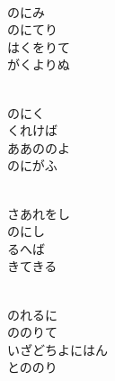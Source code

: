 \documentclass[10pt,b5j]{tarticle} %
\begin{document}
\begin{enumerate}
\begin{minipage}[c]{\blocksize}
        \vspace{\linespace}
        \item~\\
        のにみ\\
        のにてり\\
        はくをりて\\
        がくよりぬ
        
        \vspace{\linespace}
        \item~\\
        のにく\\
        くれけば\\
        ああののよ\\
        のにがふ
        
        \vspace{\linespace}
        \item~\\
        さあれをし\\
        のにし\\
        るへば\\
        きてきる
        
        \vspace{\linespace}
        \item~\\
        のれるに\\
        ののりて\\
        いざどちよにはん\\
        とののり
    
    \end{minipage}
\end{enumerate} %
\end{document}

